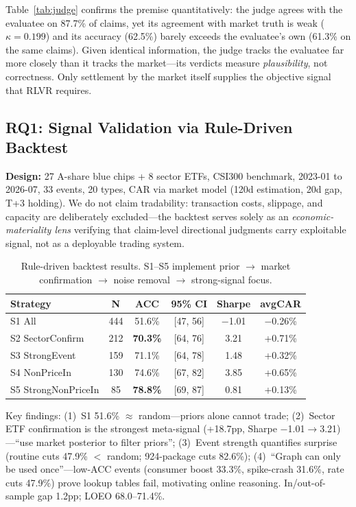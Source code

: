 \documentclass[sigconf, anonymous, review]{acmart}
\begin{document}
Table~\ref{tab:judge} confirms the premise quantitatively: the judge agrees with the evaluatee on 87.7\% of claims, yet its agreement with market truth is weak ($\kappa = 0.199$) and its accuracy (62.5\%) barely exceeds the evaluatee's own (61.3\% on the same claims). Given identical information, the judge tracks the evaluatee far more closely than it tracks the market---its verdicts measure \emph{plausibility}, not correctness. Only settlement by the market itself supplies the objective signal that RLVR requires.

\subsection{RQ1: Signal Validation via Rule-Driven Backtest}
\label{sec:backtest}

\textbf{Design:} 27 A-share blue chips + 8 sector ETFs, CSI300 benchmark, 2023-01 to 2026-07, 33 events, 20 types, CAR via market model (120d estimation, 20d gap, T+3 holding). We do not claim tradability: transaction costs, slippage, and capacity are deliberately excluded---the backtest serves solely as an \emph{economic-materiality lens} verifying that claim-level directional judgments carry exploitable signal, not as a deployable trading system.

\begin{table}[t]
\centering\footnotesize
\caption{Rule-driven backtest results. S1--S5 implement prior $\to$ market confirmation $\to$ noise removal $\to$ strong-signal focus.}
\label{tab:backtest}
\setlength{\tabcolsep}{4pt}
\begin{tabular}{@{}lccccc@{}}
\toprule
Strategy & N & ACC & 95\% CI & Sharpe & avgCAR \\
\midrule
S1 All & 444 & 51.6\% & [47, 56] & $-$1.01 & $-$0.26\% \\
S2 SectorConfirm & 212 & \textbf{70.3\%} & [64, 76] & 3.21 & +0.71\% \\
S3 StrongEvent & 159 & 71.1\% & [64, 78] & 1.48 & +0.32\% \\
S4 NonPriceIn & 130 & 74.6\% & [67, 82] & 3.85 & +0.65\% \\
S5 StrongNonPriceIn & 85 & \textbf{78.8\%} & [69, 87] & 0.81 & +0.13\% \\
\bottomrule
\end{tabular}
\end{table}

Key findings: (1)~S1 51.6\% $\approx$ random---priors alone cannot trade; (2)~Sector ETF confirmation is the strongest meta-signal (+18.7pp, Sharpe $-$1.01$\to$3.21)---``use market posterior to filter priors''; (3)~Event strength quantifies surprise (routine cuts 47.9\% $<$ random; 924-package cuts 82.6\%); (4)~``Graph can only be used once''---low-ACC events (consumer boost 33.3\%, spike-crash 31.6\%, rate cuts 47.9\%) prove lookup tables fail, motivating online reasoning. In/out-of-sample gap 1.2pp; LOEO 68.0--71.4\%.
\end{document}
